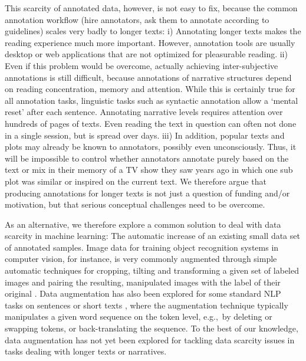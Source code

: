 \documentclass[10pt, a4paper]{article}
\begin{document}
This scarcity of annotated data, however, is not easy to fix, because the common annotation workflow (hire annotators, ask them to annotate according to guidelines) scales very badly to longer texts: i) Annotating longer texts makes the reading experience much more important. However, annotation tools are usually desktop or web applications that are not optimized for pleasurable reading. ii) Even if this problem would be overcome, actually achieving inter-subjective annotations is still difficult, because annotations of narrative structures depend on reading concentration, memory and attention. While this is certainly true for all annotation tasks, linguistic tasks such as syntactic annotation allow a `mental reset' after each sentence. Annotating narrative levels requires attention over hundreds of pages of texts. Even reading the text in question can often not done in a single session, but is spread over days.
iii) In addition, popular texts and plots may already be known to annotators, possibly even unconsciously. Thus, it will be impossible to control whether annotators annotate purely based on the text or mix in their memory of a TV show they saw years ago in which one sub plot was similar or inspired on the current text. We therefore argue that producing annotations for longer texts is not just a question of funding and/or motivation, but that serious conceptual challenges need to be overcome.

As an alternative, we therefore explore a common solution to deal with data scarcity in machine learning: The automatic increase of an existing small data set of annotated samples.
Image data for training object recognition systems in computer vision, for instance, is very commonly augmented through simple automatic techniques for cropping, tilting and transforming a given set of labeled images and pairing the resulting, manipulated images with the label of their original \cite{howard2013some,szegedy2015going}. 
Data augmentation has also been explored for some standard NLP tasks on sentences or short texts \cite{wang-etal-2018-switchout,wei-zou-2019-eda,liu-etal-2020-data}, where the augmentation technique typically manipulates a given word sequence on the token level, e.g.,~by deleting or swapping tokens, or back-translating the sequence.
To the best of our knowledge, data augmentation has not yet been explored for tackling data scarcity issues in tasks dealing with longer texts or narratives. 
\end{document}
